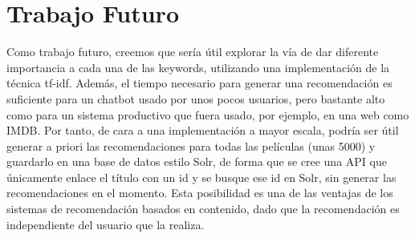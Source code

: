 \chapter{Trabajo Futuro}\label{chap:futuro}

Como trabajo futuro, creemos que sería útil explorar la vía de dar diferente importancia a cada una de las keywords, utilizando una implementación de la técnica tf-idf. Además, el tiempo necesario para generar una recomendación es suficiente para un chatbot usado por unos pocos usuarios, pero bastante alto como para un sistema productivo que fuera usado, por ejemplo, en una web como IMDB. Por tanto, de cara a una implementación a mayor escala, podría ser útil generar a priori las recomendaciones para todas las películas (unas 5000) y guardarlo en una base de datos estilo Solr, de forma que se cree una API que únicamente enlace el título con un id y se busque ese id en Solr, sin generar las recomendaciones en el momento. Esta posibilidad es una de las ventajas de los sistemas de recomendación basados en contenido, dado que la recomendación es independiente del usuario que la realiza.


